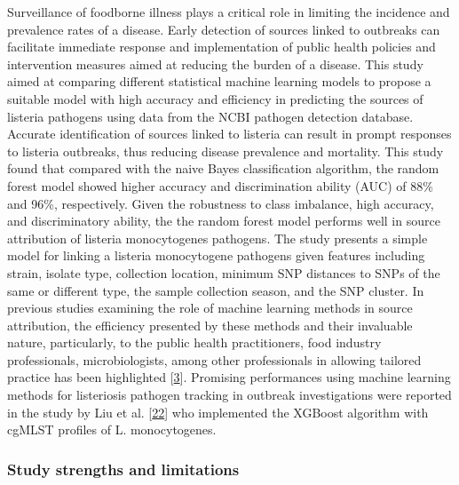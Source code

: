 \documentclass[
  10pt,
]{article}
\begin{document}
Surveillance of foodborne illness plays a critical role in limiting the incidence and prevalence rates of a disease. Early detection of sources linked to outbreaks can facilitate immediate response and implementation of public health policies and intervention measures aimed at reducing the burden of a disease. This study aimed at comparing different statistical machine learning models to propose a suitable model with high accuracy and efficiency in predicting the sources of listeria pathogens using data from the NCBI pathogen detection database. Accurate identification of sources linked to listeria can result in prompt responses to listeria outbreaks, thus reducing disease prevalence and mortality. This study found that compared with the naive Bayes classification algorithm, the random forest model showed higher accuracy and discrimination ability (AUC) of 88\% and 96\%, respectively. Given the robustness to class imbalance, high accuracy, and discriminatory ability, the the random forest model performs well in source attribution of listeria monocytogenes pathogens. The study presents a simple model for linking a listeria monocytogene pathogens given features including strain, isolate type, collection location, minimum SNP distances to SNPs of the same or different type, the sample collection season, and the SNP cluster. In previous studies examining the role of machine learning methods in source attribution, the efficiency presented by these methods and their invaluable nature, particularly, to the public health practitioners, food industry professionals, microbiologists, among other professionals in allowing tailored practice has been highlighted {[}\protect\hyperlink{ref-tanui2022machine}{3}{]}. Promising performances using machine learning methods for listeriosis pathogen tracking in outbreak investigations were reported in the study by Liu et al. {[}\protect\hyperlink{ref-liu2021machine}{22}{]} who implemented the XGBoost algorithm with cgMLST profiles of L. monocytogenes.

\hypertarget{study-strengths-and-limitations}{%
\subsubsection{Study strengths and limitations}\label{study-strengths-and-limitations}}
\end{document}

